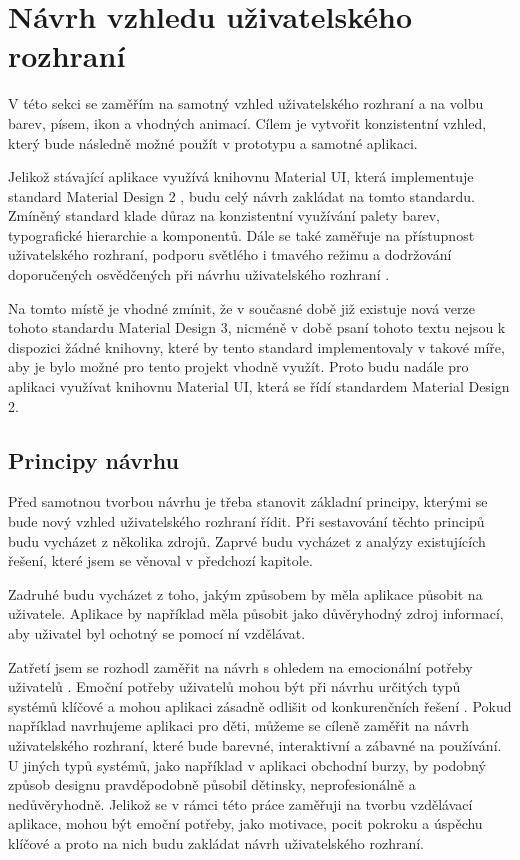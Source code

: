 \section{Návrh vzhledu uživatelského rozhraní}

V této sekci se zaměřím na samotný vzhled uživatelského rozhraní a na volbu barev, písem, ikon a vhodných animací. Cílem je vytvořit konzistentní vzhled, který bude následně možné použít v prototypu a samotné aplikaci.

Jelikož stávající aplikace využívá knihovnu Material UI, která implementuje standard Material Design 2 \cite{MaterialUI}, budu celý návrh zakládat na tomto standardu. Zmíněný standard klade důraz na konzistentní využívání palety barev, typografické hierarchie a komponentů. Dále se také zaměřuje na přístupnost uživatelského rozhraní, podporu světlého i tmavého režimu a dodržování doporučených osvědčených při návrhu uživatelského rozhraní \cite{MaterialDesign2}.

Na tomto místě je vhodné zmínit, že v současné době již existuje nová verze tohoto standardu Material Design 3, nicméně v době psaní tohoto textu nejsou k dispozici žádné knihovny, které by tento standard implementovaly v takové míře, aby je bylo možné pro tento projekt vhodně využít. Proto budu nadále pro aplikaci využívat knihovnu Material UI, která se řídí standardem Material Design 2.

\subsection{Principy návrhu}

Před samotnou tvorbou návrhu je třeba stanovit základní principy, kterými se bude nový vzhled uživatelského rozhraní řídit. Při sestavování těchto principů budu vycházet z několika zdrojů. Zaprvé budu vycházet z analýzy existujících řešení, které jsem se věnoval v předchozí kapitole.

Zadruhé budu vycházet z toho, jakým způsobem by měla aplikace působit na uživatele. Aplikace by například měla působit jako důvěryhodný zdroj informací, aby uživatel byl ochotný se pomocí ní vzdělávat.

Zatřetí jsem se rozhodl zaměřit na návrh s ohledem na emocionální potřeby uživatelů \cite[385]{Hartson2019TheUxBook}. Emoční potřeby uživatelů mohou být při návrhu určitých typů systémů klíčové a mohou aplikaci zásadně odlišit od konkurenčních řešení \cite[387]{Hartson2019TheUxBook}. Pokud například navrhujeme aplikaci pro děti, můžeme se cíleně zaměřit na návrh uživatelského rozhraní, které bude barevné, interaktivní a zábavné na používání. U jiných typů systémů, jako například v aplikaci obchodní burzy, by podobný způsob designu pravděpodobně působil dětinsky, neprofesionálně a nedůvěryhodně. Jelikož se v rámci této práce zaměřuji na tvorbu vzdělávací aplikace, mohou být emoční potřeby, jako motivace, pocit pokroku a úspěchu klíčové a proto na nich budu zakládat návrh uživatelského rozhraní.

